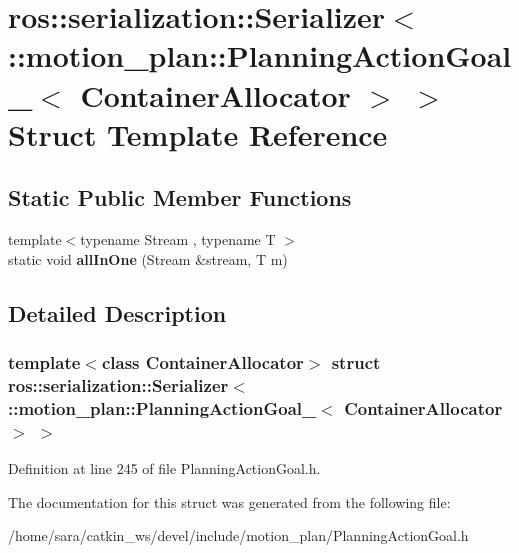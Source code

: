 \hypertarget{structros_1_1serialization_1_1Serializer_3_01_1_1motion__plan_1_1PlanningActionGoal___3_01ContainerAllocator_01_4_01_4}{}\section{ros\+:\+:serialization\+:\+:Serializer$<$ \+:\+:motion\+\_\+plan\+:\+:Planning\+Action\+Goal\+\_\+$<$ Container\+Allocator $>$ $>$ Struct Template Reference}
\label{structros_1_1serialization_1_1Serializer_3_01_1_1motion__plan_1_1PlanningActionGoal___3_01ContainerAllocator_01_4_01_4}
\subsection*{Static Public Member Functions}
\begin{DoxyCompactItemize}
\item 
\mbox{\label{structros_1_1serialization_1_1Serializer_3_01_1_1motion__plan_1_1PlanningActionGoal___3_01ContainerAllocator_01_4_01_4_a82d3383878da67e52ae434b9a426df90}} 
{\footnotesize template$<$typename Stream , typename T $>$ }\\static void {\bfseries all\+In\+One} (Stream \&stream, T m)
\end{DoxyCompactItemize}


\subsection{Detailed Description}
\subsubsection*{template$<$class Container\+Allocator$>$\newline
struct ros\+::serialization\+::\+Serializer$<$ \+::motion\+\_\+plan\+::\+Planning\+Action\+Goal\+\_\+$<$ Container\+Allocator $>$ $>$}



Definition at line 245 of file Planning\+Action\+Goal.\+h.



The documentation for this struct was generated from the following file\+:\begin{DoxyCompactItemize}
\item 
/home/sara/catkin\+\_\+ws/devel/include/motion\+\_\+plan/Planning\+Action\+Goal.\+h\end{DoxyCompactItemize}

